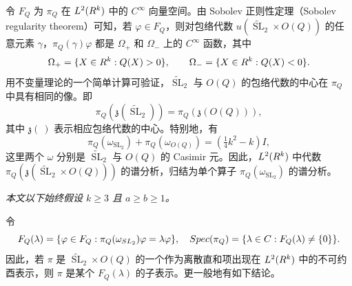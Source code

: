 令 $F_Q$ 为 $\pi_Q$ 在 $L^2(R^k)$ 中的 $C^\infty$ 向量空间。由 Sobolev 正则性定理（Sobolev regularity theorem）可知，若 $\varphi\in F_Q$，则对包络代数 $u(\widetilde{\operatorname{SL}}_2\times O(Q))$ 的任意元素 $\gamma$，$\pi_Q(\gamma)\varphi$ 都是 $\Omega_+$ 和 $\Omega_-$ 上的 $C^\infty$ 函数，其中
\[
 \Omega_+=\{X\in R^k:Q(X)>0\},\qquad
 \Omega_-=\{X\in R^k:Q(X)<0\}.
\]
用不变量理论的一个简单计算可验证，$\widetilde{\operatorname{SL}}_2$ 与 $O(Q)$ 的包络代数的中心在 $\pi_Q$ 中具有相同的像。即
\[
 \pi_Q(\mathfrak z(\widetilde{\operatorname{SL}}_2))=\pi_Q(\mathfrak z(O(Q))),
\]
其中 $\mathfrak z(\ )$ 表示相应包络代数的中心。特别地，有
\[
 \pi_Q(\omega_{\operatorname{SL}_2})+\pi_Q(\omega_{O(Q)})
 =(\tfrac14k^2-k)I,
\]
这里两个 $\omega$ 分别是 $\widetilde{\operatorname{SL}}_2$ 与 $O(Q)$ 的 Casimir 元。因此，$L^2(R^k)$ 中代数 $\pi_Q(\mathfrak z(\widetilde{\operatorname{SL}}_2\times O(Q)))$ 的谱分析，归结为单个算子 $\pi_Q(\omega_{\operatorname{SL}_2})$ 的谱分析。

\textit{本文以下始终假设 $k\ge3$ 且 $a\ge b\ge1$。}

令
\[
 F_Q(\lambda)=\{\varphi\in F_Q:\pi_Q(\omega_{SL_2})\varphi=\lambda\varphi\},
 \quad Spec(\pi_Q)=\{\lambda\in C:F_Q(\lambda)\ne\{0\}\}.
\]
因此，若 $\pi$ 是 $\widetilde{\operatorname{SL}}_2\times O(Q)$ 的一个作为离散直和项出现在 $L^2(R^k)$ 中的不可约酉表示，则 $\pi$ 是某个 $F_Q(\lambda)$ 的子表示。更一般地有如下结论。

